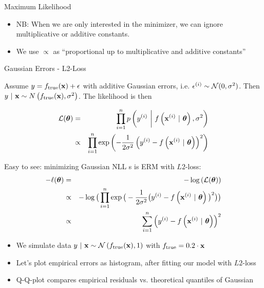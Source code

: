 \documentclass[11pt,compress,t,notes=noshow, xcolor=table]{beamer}
\begin{document}
\begin{vbframe}{Maximum Likelihood}
\begin{itemize}
\item NB: When we are only interested in the minimizer, we can ignore multiplicative or additive constants.
\item We use $\propto$ as \enquote{proportional up to multiplicative and additive constants}

\end{itemize}

\end{vbframe}


\begin{vbframe}{Gaussian Errors - L2-Loss} 

Assume $y = f_{\text{true}}(\mathbf{x}) + \epsilon$ with additive Gaussian errors, i.e. $\epsilon^{(i)} \sim \mathcal{N}(0, \sigma^2)$. Then $y~|~\mathbf{x} \sim N\left(f_{\text{true}}(\mathbf{x}), \sigma^2\right)$. The likelihood is then 

{\small
\begin{eqnarray*}
\mathcal{L}(\bm{\theta}) &=& \prod\limits_{i=1}^n p\left(y^{(i)} ~\bigg|~ f\left(\mathbf{x}^{(i)} ~|~ \bm{\theta}\right), \sigma^2\right) \\ &\propto& \prod\limits_{i=1}^n \exp\left(-\frac{1}{2\sigma^2} \left(y^{(i)} - f\left(\mathbf{x}^{(i)} ~|~ \bm{\theta}\right)\right)^2\right)
\end{eqnarray*}
}


Easy to see: minimizing Gaussian NLL s is ERM with $L2$-loss:
{\small
\begin{eqnarray*}
- \ell(\bm{\theta}) &=& - \log\left(\mathcal{L}(\bm{\theta})\right) \\
&\propto& - \log\big(\prod\limits_{i=1}^n \exp\big(-\frac{1}{2\sigma^2} \big(y^{(i)} - f\left(\mathbf{x}^{(i)} ~|~ \bm{\theta}\right)\big)^2\big)\big) \\
&\propto& \sum\limits_{i=1}^n \left(y^{(i)} - f\left(\mathbf{x}^{(i)} ~|~ \bm{\theta}\right)\right)^2
\end{eqnarray*}
}

\framebreak 

\begin{footnotesize}
\begin{itemize}
	\item We simulate data $y ~|~\mathbf{x} \sim \mathcal{N}\left(f_{\text{true}}(\mathbf{x}), 1\right)$ with $f_{\text{true}} = 0.2 \cdot \mathbf{x}$ 
\item Let's plot empirical errors as histogram, after fitting our model with $L2$-loss
\item Q-Q-plot compares empirical residuals vs. theoretical quantiles of Gaussian 
\end{itemize}
\end{footnotesize}


\end{vbframe}
\end{document}
